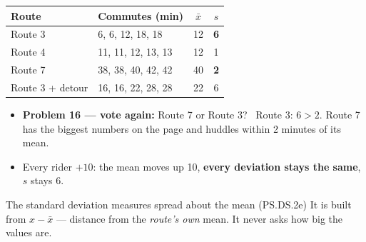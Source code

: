 \documentclass[aspectratio=169, 11pt]{beamer}
\newcommand{\redink}[1]{{\color{redacc}\bfseries #1}}
\begin{document}
\begin{frame}[t, plain]
  \vspace{2pt}
  \begin{center}
    \small\renewcommand{\arraystretch}{1.25}
    \begin{tabular}{l l c c}
      \hline
      \textbf{Route} & \textbf{Commutes (min)} & $\bar{x}$ & $s$ \\
      \hline
      Route 3 & 6, 6, 12, 18, 18 & 12 & \redink{6} \\
      Route 4 & 11, 11, 12, 13, 13 & 12 & 1 \\
      Route 7 & 38, 38, 40, 42, 42 & 40 & \redink{2} \\
      Route 3 + detour & 16, 16, 22, 28, 28 & 22 & 6 \\
      \hline
    \end{tabular}
  \end{center}
  \begin{itemize}\setlength{\itemsep}{3pt}
    \item \textbf{Problem 16 --- vote again:} Route 7 or Route 3? \ Route 3: $6 > 2$. Route 7 has
          the biggest numbers on the page and huddles within 2 minutes of its mean.
    \item Every rider $+10$: the mean moves up 10, \redink{every deviation stays the same}, $s$ stays 6.
  \end{itemize}
  \begin{block}{The standard deviation measures spread about the mean (PS.DS.2e)}
    It is built from $x - \bar{x}$ --- distance from the \emph{route's own} mean. It never asks
    how big the values are.
  \end{block}
\end{frame}
\end{document}
